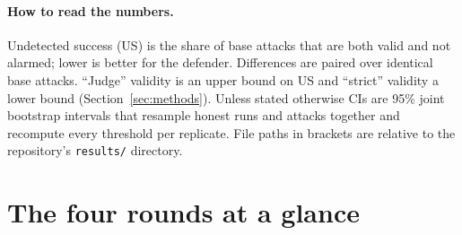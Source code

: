 \documentclass[11pt]{article}
\begin{document}
\paragraph{How to read the numbers.} Undetected success (US) is the share of base attacks that are both valid and not alarmed; lower is better for the defender. Differences are paired over identical base attacks. ``Judge'' validity is an upper bound on US and ``strict'' validity a lower bound (Section~\ref{sec:methods}). Unless stated otherwise CIs are 95\% joint bootstrap intervals that resample honest runs and attacks together and recompute every threshold per replicate. File paths in brackets are relative to the repository's \texttt{results/} directory.

\section{The four rounds at a glance}
\end{document}
